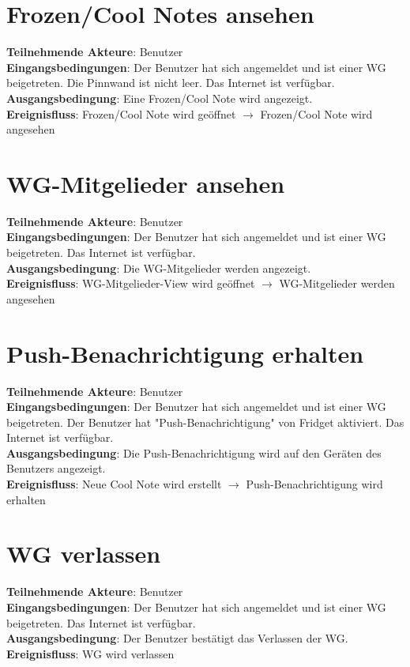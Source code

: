\documentclass[a4paper]{scrreprt}
\begin{document}
		\section{Frozen/Cool Notes ansehen}
		\textbf{Teilnehmende Akteure}: Benutzer \\
		\textbf{Eingangsbedingungen}: Der Benutzer hat sich angemeldet und ist einer WG beigetreten. Die Pinnwand ist nicht leer. Das Internet ist verfügbar. \\
		\textbf{Ausgangsbedingung}: Eine Frozen/Cool Note wird angezeigt. \\
		\textbf{Ereignisfluss}: Frozen/Cool Note wird geöffnet $\rightarrow$ Frozen/Cool Note wird angesehen
		
		\section{WG-Mitgelieder ansehen}
		\textbf{Teilnehmende Akteure}: Benutzer \\
		\textbf{Eingangsbedingungen}: Der Benutzer hat sich angemeldet und ist einer WG beigetreten. Das Internet ist verfügbar. \\
		\textbf{Ausgangsbedingung}: Die WG-Mitgelieder werden angezeigt. \\
		\textbf{Ereignisfluss}: WG-Mitgelieder-View wird geöffnet $\rightarrow$ WG-Mitgelieder werden angesehen
		
		\section{Push-Benachrichtigung erhalten}
		\textbf{Teilnehmende Akteure}: Benutzer \\
		\textbf{Eingangsbedingungen}: Der Benutzer hat sich angemeldet und ist einer WG beigetreten. Der Benutzer hat "Push-Benachrichtigung" von Fridget aktiviert. Das Internet ist verfügbar. \\
		\textbf{Ausgangsbedingung}: Die Push-Benachrichtigung wird auf den Geräten des Benutzers angezeigt. \\
		\textbf{Ereignisfluss}: Neue Cool Note wird erstellt $\rightarrow$ Push-Benachrichtigung wird erhalten
		
		\section{WG verlassen}
		\textbf{Teilnehmende Akteure}: Benutzer \\
		\textbf{Eingangsbedingungen}: Der Benutzer hat sich angemeldet und ist einer WG beigetreten. Das Internet ist verfügbar. \\
		\textbf{Ausgangsbedingung}: Der Benutzer bestätigt das Verlassen der WG. \\
		\textbf{Ereignisfluss}: WG wird verlassen
\end{document}
